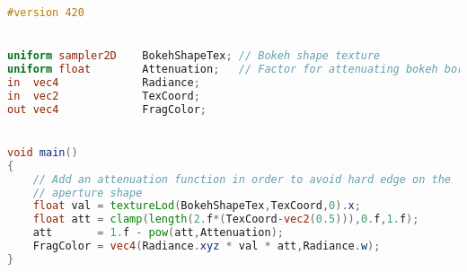 \begin{lstlisting}[language=GLSL,float={htb},caption={Fragment shader for rendering bokeh.},label={YourName:listing1}]
#version 420


uniform sampler2D    BokehShapeTex; // Bokeh shape texture
uniform float        Attenuation;   // Factor for attenuating bokeh borders
in  vec4             Radiance;
in  vec2             TexCoord;
out vec4             FragColor;


void main()
{
	// Add an attenuation function in order to avoid hard edge on the 
	// aperture shape
	float val = textureLod(BokehShapeTex,TexCoord,0).x;
	float att = clamp(length(2.f*(TexCoord-vec2(0.5))),0.f,1.f);
	att       = 1.f - pow(att,Attenuation);
	FragColor = vec4(Radiance.xyz * val * att,Radiance.w);
}
\end{lstlisting}
















